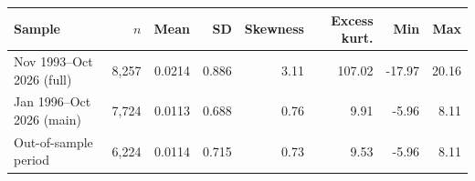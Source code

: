 \begin{tabular}{lrrrrrrr}
\toprule
Sample & $n$ & Mean & SD & Skewness & Excess kurt. & Min & Max \\
\midrule
Nov 1993--Oct 2026 (full) & 8,257 & 0.0214 & 0.886 & 3.11 & 107.02 & -17.97 & 20.16 \\
Jan 1996--Oct 2026 (main) & 7,724 & 0.0113 & 0.688 & 0.76 & 9.91 & -5.96 & 8.11 \\
Out-of-sample period & 6,224 & 0.0114 & 0.715 & 0.73 & 9.53 & -5.96 & 8.11 \\
\bottomrule
\end{tabular}
